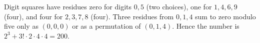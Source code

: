 Digit squares have residues zero for digits $0,5$ (two choices), one for $1,4,6,9$ (four), and four for $2,3,7,8$ (four). Three residues from $0,1,4$ sum to zero modulo five only as $(0,0,0)$ or as a permutation of $(0,1,4)$. Hence the number is $2^3+3!\cdot2\cdot4\cdot4=\boxed{200}$.
